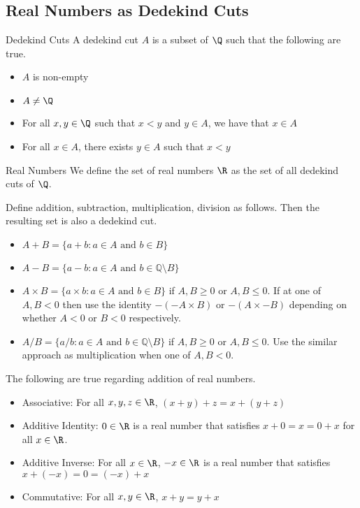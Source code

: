 \documentclass[a4paper]{article}
\begin{document}
\subsection{Real Numbers as Dedekind Cuts}
\begin{defn}{Dedekind Cuts}{} A dedekind cut $A$ is a subset of $\Q$ such that the following are true. 
\begin{itemize}
\item $A$ is non-empty
\item $A\neq\Q$
\item For all $x,y\in\Q$ such that $x<y$ and $y\in A$, we have that $x\in A$
\item For all $x\in A$, there exists $y\in A$ such that $x<y$
\end{itemize}
\end{defn}

\begin{defn}{Real Numbers}{} We define the set of real numbers $\R$ as the set of all dedekind cuts of $\Q$. 
\end{defn}

\begin{prp}{}{} Define addition, subtraction, multiplication, division as follows. Then the resulting set is also a dedekind cut. 
\begin{itemize}
\item $A+B=\{a+b:a\in A\text{ and }b\in B\}$
\item $A-B=\{a-b:a\in A\text{ and }b\in \mathbb{Q}\setminus B\}$
\item $A\times B=\{a\times b:a\in A\text{ and }b\in B\}$ if $A,B\geq 0$ or $A,B\leq 0$. If at one of $A,B<0$ then use the identity $-(-A\times B)$ or $-(A\times -B)$ depending on whether $A<0$ or $B<0$ respectively. 
\item $A/B=\{a/b:a\in A\text{ and }b\in \mathbb{Q}\setminus B\}$ if $A,B\geq 0$ or $A,B\leq 0$. Use the similar approach as multiplication when one of $A,B<0$. 
\end{itemize}
\end{prp}

\begin{prp}{}{} The following are true regarding addition of real numbers. 
\begin{itemize}
\item Associative: For all $x,y,z\in\R$, $(x+y)+z=x+(y+z)$
\item Additive Identity: $0\in\R$ is a real number that satisfies $x+0=x=0+x$ for all $x\in\R$. 
\item Additive Inverse: For all $x\in\R$, $-x\in\R$ is a real number that satisfies $x+(-x)=0=(-x)+x$
\item Commutative: For all $x,y\in\R$, $x+y=y+x$
\end{itemize}
\end{prp}
\end{document}
